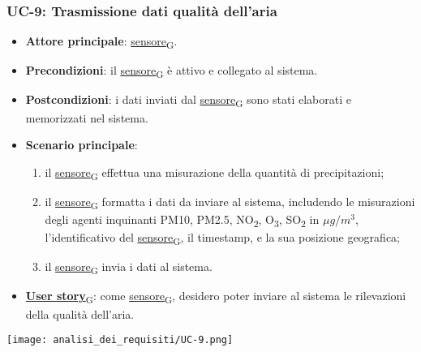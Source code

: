 \subsubsection{UC-9: Trasmissione dati qualità dell'aria}
\begin{itemize}
	\item \textbf{Attore principale}: \href{https://7last.github.io/docs/pb/documentazione-interna/glossario\#sensore}{sensore\textsubscript{G}}.
	\item \textbf{Precondizioni}: il \href{https://7last.github.io/docs/pb/documentazione-interna/glossario\#sensore}{sensore\textsubscript{G}} è attivo e collegato al sistema.
	\item \textbf{Postcondizioni}: i dati inviati dal \href{https://7last.github.io/docs/pb/documentazione-interna/glossario\#sensore}{sensore\textsubscript{G}} sono stati elaborati e memorizzati nel sistema.
	\item \textbf{Scenario principale}:
	      \begin{enumerate}
		      \item il \href{https://7last.github.io/docs/pb/documentazione-interna/glossario\#sensore}{sensore\textsubscript{G}} effettua una misurazione della quantità di precipitazioni;
		      \item il \href{https://7last.github.io/docs/pb/documentazione-interna/glossario\#sensore}{sensore\textsubscript{G}} formatta i dati da inviare al sistema, includendo le misurazioni degli agenti inquinanti PM10, PM2.5, NO\textsubscript{2}, O\textsubscript{3}, SO\textsubscript{2}
		            in $\mu g/m^3$, l'identificativo del \href{https://7last.github.io/docs/pb/documentazione-interna/glossario\#sensore}{sensore\textsubscript{G}}, il timestamp, e la sua posizione geografica;
		      \item il \href{https://7last.github.io/docs/pb/documentazione-interna/glossario\#sensore}{sensore\textsubscript{G}} invia i dati al sistema.
	      \end{enumerate}
	\item \href{https://7last.github.io/docs/pb/documentazione-interna/glossario\#user-story}{\textbf{User story}\textsubscript{G}}:
	      come \href{https://7last.github.io/docs/pb/documentazione-interna/glossario\#sensore}{sensore\textsubscript{G}}, desidero poter inviare al sistema le rilevazioni della qualità dell'aria.
\end{itemize}

\begin{center}
	\texttt{[image: analisi\_dei\_requisiti/UC-9.png]}
\end{center}

